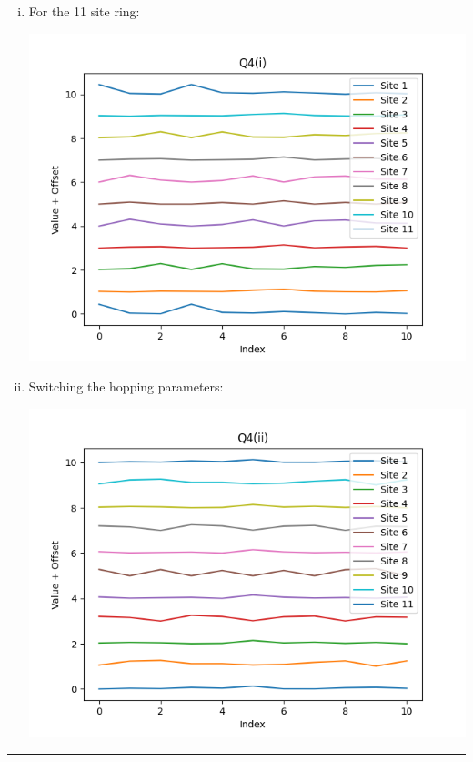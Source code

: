 \documentclass[11pt]{article}
\begin{document}
\begin{enumerate}[(i).]
  \item For the 11 site ring:
  \begin{center}
    \includegraphics*[scale=0.7]{plots/Q4part1.png}
  \end{center}

  \item Switching the hopping parameters:
  \begin{center}
    \includegraphics*[scale=0.7]{plots/Q4part2.png}
  \end{center}
\end{enumerate}


\vskip 1cm
\hrule
\end{document}
